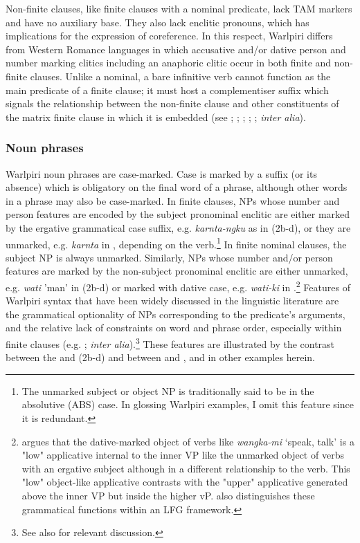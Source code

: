 \documentclass[output=paper]{../langscibook}
\begin{document}
Non-finite clauses, like finite clauses with a nominal predicate, lack TAM markers and have no auxiliary base. They also lack enclitic pronouns, which has implications for the expression of coreference. In this respect, Warlpiri differs from Western Romance languages in which accusative and/or dative person and number marking clitics including an anaphoric clitic occur in both finite and non-finite clauses. Unlike a nominal, a bare infinitive verb cannot function as the main predicate of a finite clause; it must host a complementiser suffix which signals the relationship between the non-finite clause and other constituents of the matrix finite clause in which it is embedded (see \citealt{Hale1982}; \citealt{Laughren2017}; \citealt{Nash1986}; \citealt{SimpsonBresnan1983}; \citealt{Simpson1991}; \textit{inter alia}).

\subsubsection{Noun phrases}\label{sec:laughren:1.2.2}

Warlpiri noun phrases are case-marked. Case is marked by a suffix (or its absence) which is obligatory on the final word of a phrase, although other words in a phrase may also be case-marked. In finite clauses, NPs whose number and person features are encoded by the subject pronominal enclitic are either marked by the ergative grammatical case suffix, e.g. \textit{karnta-ngku} as in (2b-d), or they are unmarked, e.g. \textit{karnta} in , depending on the verb.\footnote{The unmarked subject or object NP is traditionally said to be in the absolutive (ABS) case. In glossing Warlpiri examples, I omit this feature since it is redundant.} In finite nominal clauses, the subject NP is always unmarked. Similarly, NPs whose number and/or person features are marked by the non-subject pronominal enclitic are either unmarked, e.g. \textit{wati} 'man' in (2b-d) or marked with dative case, e.g. \textit{wati-ki} in .\footnote{\citet{Legate2002} argues that the dative-marked object of verbs like \textit{wangka-mi} `speak, talk' is a "low" applicative internal to the inner VP like the unmarked object of verbs with an ergative subject although in a different relationship to the verb. This "low" object-like applicative contrasts with the "upper" applicative generated above the inner VP but inside the higher vP. \citet{Simpson1991} also distinguishes these grammatical functions within an LFG framework.} Features of Warlpiri syntax that have been widely discussed in the linguistic literature are the grammatical optionality of NPs corresponding to the predicate's arguments, and the relative lack of constraints on word and phrase order, especially within finite clauses (e.g. \citealt{Hale1983, Jelinek1984, Laughren2002, Legate2002, MushinSimpson2008, Nash1986, Simpson1991}; \textit{inter alia}).\footnote{See also \citet{Pensalfini2004} for relevant discussion.} These features are illustrated by the contrast between the  and (2b-d) and between  and , and in other examples herein.
\end{document}
